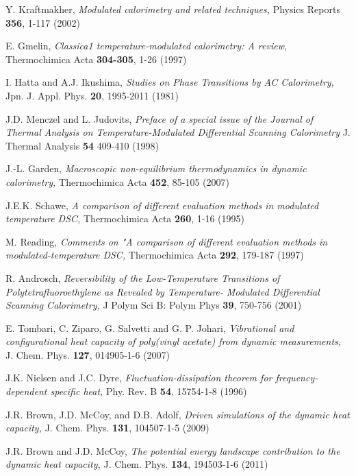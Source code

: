 \documentclass[pre,a4paper,twocolumn,superscriptaddress,%
floatfix]{revtex4}
\begin{document}
\begin{thebibliography}{xx}

Y. Kraftmakher,
{\it Modulated calorimetry and related techniques,}
Physics Reports {\bf 356}, 1-117 (2002)

E. Gmelin,
{\it Classica1 temperature-modulated calorimetry: A review,}
Thermochimica Acta {\bf 304-305}, 1-26 (1997)
  
I. Hatta and A.J. Ikushima,
{\it Studies on Phase Transitions by AC Calorimetry,}
Jpn. J. Appl. Phys. {\bf 20}, 1995-2011 (1981)

J.D. Menczel and L. Judovits,
{\it Preface of a special issue of the Journal of Thermal Analysis on
  Temperature-Modulated Differential Scanning Calorimetry}
J. Thermal Analysis {\bf 54} 409-410 (1998)

J.-L. Garden,
{\it Macroscopic non-equilibrium thermodynamics in dynamic calorimetry,}
Thermochimica Acta {\bf 452}, 85-105 (2007)

J.E.K. Schawe,
{\it A comparison of different evaluation methods in modulated temperature
  DSC,}
Thermochimica Acta {\bf 260}, 1-16 (1995)

M. Reading,
{\it Comments on "A comparison of different evaluation methods
  in modulated-temperature DSC,}
Thermochimica Acta {\bf 292}, 179-187 (1997)

R. Androsch,
{\it Reversibility of the Low-Temperature Transitions of
Polytetrafluoroethylene as Revealed by Temperature- Modulated Differential
Scanning Calorimetry,}
J Polym Sci B: Polym Phys {\bf 39}, 750-756 (2001)

E. Tombari, C. Ziparo, G. Salvetti and G. P. Johari,
{\it Vibrational and configurational heat capacity of poly(vinyl acetate)
  from dynamic measurements,}
J. Chem. Phys. {\bf 127}, 014905-1-6 (2007)

J.K. Nielsen and J.C. Dyre,
{\it Fluctuation-dissipation theorem for frequency-dependent specific heat,}
Phy. Rev. B {\bf 54}, 15754-1-8 (1996)

J.R. Brown, J.D. McCoy, and D.B. Adolf,
{\it Driven simulations of the dynamic heat capacity,}
J. Chem. Phys. {\bf 131}, 104507-1-5 (2009)

J.R. Brown and J.D. McCoy,
{\it The potential energy landscape contribution to the dynamic heat capacity,}
J. Chem. Phys. {\bf 134}, 194503-1-6 (2011)


\end{thebibliography}
\end{document}
